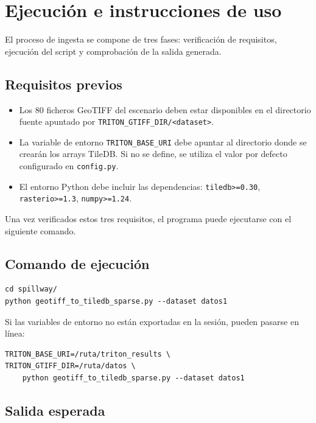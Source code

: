 \section{Ejecución e instrucciones de uso}\label{d.6-ejecucion}

El proceso de ingesta se compone de tres fases: verificación de requisitos, ejecución del script y comprobación de la salida generada.

\subsection{Requisitos previos}\label{d.6.1-requisitos}

\begin{itemize}
\item Los 80 ficheros GeoTIFF del escenario deben estar disponibles en el directorio fuente apuntado por \texttt{TRITON\_GTIFF\_DIR/<dataset>}.
\item La variable de entorno \texttt{TRITON\_BASE\_URI} debe apuntar al directorio donde se crearán los arrays TileDB. Si no se define, se utiliza el valor por defecto configurado en \texttt{config.py}.
\item El entorno Python debe incluir las dependencias: \texttt{tiledb>=0.30}, \texttt{rasterio>=1.3}, \texttt{numpy>=1.24}.
\end{itemize}

Una vez verificados estos tres requisitos, el programa puede ejecutarse con el siguiente comando.

\subsection{Comando de ejecución}\label{d.6.2-comando}

\begin{verbatim}
cd spillway/
python geotiff_to_tiledb_sparse.py --dataset datos1
\end{verbatim}

Si las variables de entorno no están exportadas en la sesión, pueden pasarse en línea:

\begin{verbatim}
TRITON_BASE_URI=/ruta/triton_results \
TRITON_GTIFF_DIR=/ruta/datos \
    python geotiff_to_tiledb_sparse.py --dataset datos1
\end{verbatim}

\subsection{Salida esperada}\label{d.6.3-salida}

